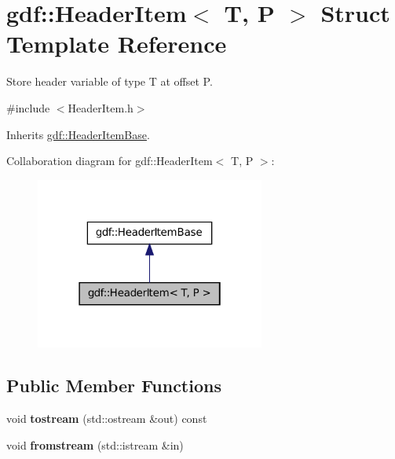 \hypertarget{structgdf_1_1_header_item}{
\section{gdf::HeaderItem$<$ T, P $>$ Struct Template Reference}
\label{structgdf_1_1_header_item}
}


Store header variable of type T at offset P.  




{\ttfamily \#include $<$HeaderItem.h$>$}



Inherits \hyperlink{structgdf_1_1_header_item_base}{gdf::HeaderItemBase}.



Collaboration diagram for gdf::HeaderItem$<$ T, P $>$:
\nopagebreak
\begin{figure}[H]
\begin{center}
\leavevmode
\includegraphics[width=214pt]{structgdf_1_1_header_item__coll__graph}
\end{center}
\end{figure}
\subsection*{Public Member Functions}
\begin{DoxyCompactItemize}
\item 
\hypertarget{structgdf_1_1_header_item_ab42a9a6c269c8017bda2c3fad2e7f380}{
void {\bfseries tostream} (std::ostream \&out) const }
\label{structgdf_1_1_header_item_ab42a9a6c269c8017bda2c3fad2e7f380}

\item 
\hypertarget{structgdf_1_1_header_item_af5858887d1a71550ef9b075bea208f9e}{
void {\bfseries fromstream} (std::istream \&in)}
\label{structgdf_1_1_header_item_af5858887d1a71550ef9b075bea208f9e}

\end{DoxyCompactItemize}
